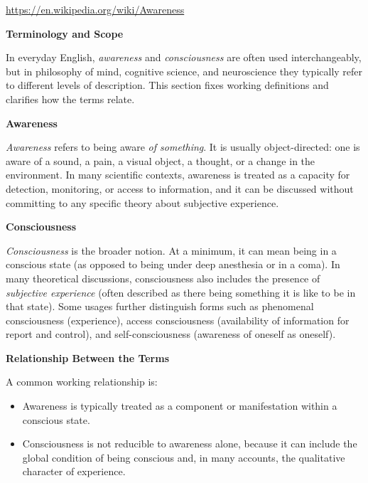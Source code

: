 \documentclass{book}
\providecommand{\ProjectDeepHeading}[2]{%
    \par\medskip\noindent\textbf{#2}\par\smallskip
}
\begin{document}
\url{https://en.wikipedia.org/wiki/Awareness}


\ProjectDeepHeading{4}{Terminology and Scope}
        
        In everyday English, \emph{awareness} and \emph{consciousness} are often used interchangeably, but in philosophy of mind, cognitive science, and neuroscience they typically refer to different levels of description. This section fixes working definitions and clarifies how the terms relate.
    
    
    \ProjectDeepHeading{4}{Awareness}
        
        \emph{Awareness} refers to being aware \emph{of something}. It is usually object-directed: one is aware of a sound, a pain, a visual object, a thought, or a change in the environment. In many scientific contexts, awareness is treated as a capacity for detection, monitoring, or access to information, and it can be discussed without committing to any specific theory about subjective experience.
    
    
    \ProjectDeepHeading{4}{Consciousness}
        
        \emph{Consciousness} is the broader notion. At a minimum, it can mean being in a conscious state (as opposed to being under deep anesthesia or in a coma). In many theoretical discussions, consciousness also includes the presence of \emph{subjective experience} (often described as there being something it is like to be in that state). Some usages further distinguish forms such as phenomenal consciousness (experience), access consciousness (availability of information for report and control), and self-consciousness (awareness of oneself as oneself).
    
    
    \ProjectDeepHeading{4}{Relationship Between the Terms}
        
        A common working relationship is:
        \begin{itemize}
            \item Awareness is typically treated as a component or manifestation within a conscious state.
            \item Consciousness is not reducible to awareness alone, because it can include the global condition of being conscious and, in many accounts, the qualitative character of experience.
        \end{itemize}
        
\end{document}
